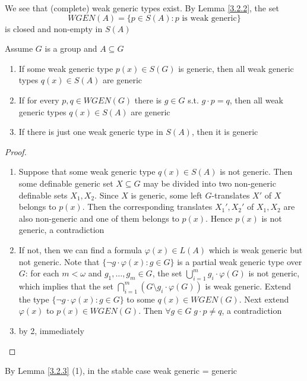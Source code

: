 \documentclass[11pt]{article}
\begin{document}
We see that (complete) weak generic types exist. By Lemma \ref{3.2.2}, the set
\begin{equation*}
WGEN(A)=\{p\in S(A):p\text{ is weak generic}\}
\end{equation*}
is closed and non-empty in \(S(A)\)

\begin{lemma}[]
\label{3.2.3}
Assume \(G\) is a group and \(A\subseteq G\)
\begin{enumerate}
\item If some weak generic type \(p(x)\in S(G)\) is generic, then all weak generic
types \(q(x)\in S(A)\) are generic
\item If for every \(p,q\in WGEN(G)\) there is \(g\in G\) s.t. \(g\cdot p=q\), then all weak generic
types \(q(x)\in S(A)\) are generic
\item If there is just one weak generic type in \(S(A)\), then it is generic
\end{enumerate}
\end{lemma}

\begin{proof}
\begin{enumerate}
\item Suppose that some weak generic type \(q(x)\in S(A)\) is not generic. Then some definable
generic set \(X\subseteq G\) may be divided into two non-generic definable sets \(X_1,X_2\).
Since \(X\) is generic, some left \(G\)-translates \(X'\) of \(X\) belongs to \(p(x)\). Then
the corresponding translates \(X_1',X_2'\) of \(X_1,X_2\) are also non-generic and one of them
belongs to \(p(x)\). Hence \(p(x)\) is not generic, a contradiction
\item If not, then we can find a formula \(\varphi(x)\in L(A)\) which is weak generic but not generic. Note
that \(\{\neg g\cdot\varphi(x):g\in G\}\) is a partial weak generic type over \(G\): for each \(m<\omega\)
and \(g_1,\dots,g_m\in G\), the set \(\bigcup_{i=1}^mg_i\cdot\varphi(G)\) is not generic, which implies that the
set \(\bigcap_{i=1}^m(G\setminus g_i\cdot\varphi(G))\) is weak generic. Extend the type \(\{\neg g\cdot\varphi(x):g\in G\}\) to
some \(q(x)\in WGEN(G)\). Next extend \(\varphi(x)\) to \(p(x)\in WGEN(G)\). Then \(\forall g\in G\;g\cdot p\neq q\),
a contradiction
\item by 2, immediately
\end{enumerate}
\end{proof}

By Lemma \ref{3.2.3} (1), in the stable case weak generic = generic
\end{document}
